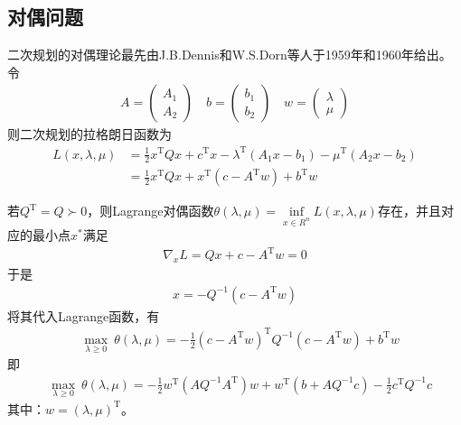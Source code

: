     \subsection{对偶问题}
        \par
        二次规划的对偶理论最先由J.B.Dennis和W.S.Dorn等人于1959年和1960年给出。令
        \begin{align*}
        A=\begin{pmatrix} A_1 \\ A_2\end{pmatrix}\quad b=\begin{pmatrix} b_1\\b_2 \end{pmatrix} \quad w=\begin{pmatrix}\lambda \\\mu \end{pmatrix}
        \end{align*}
        则二次规划的拉格朗日函数为
        \begin{align*}
         L(x,\lambda,\mu)&=\frac{1}{2}x^\mathrm{T} Qx+c^\mathrm{T} x-{\lambda}^\mathrm{T} (A_1x-b_1)-{\mu}^\mathrm{T} (A_2x-b_2)\\
         &=\frac{1}{2}x^\mathrm{T} Qx+x^\mathrm{T} (c-A^\mathrm{T} w)+b^\mathrm{T} w
        \end{align*}
        \par
        若$Q^\mathrm{T} =Q\succ 0$，则Lagrange对偶函数$\theta(\lambda,\mu)=\mathop {\inf}\limits_{x \in R^n}L(x,\lambda,\mu)$存在，并且对应的最小点$x^*$满足
        \begin{align*}
         {\nabla}_xL=Qx+c-A^\mathrm{T} w=0
        \end{align*}
        于是
        \begin{align*}
         x=-Q^{-1}(c-A^\mathrm{T} w)
        \end{align*}
        将其代入Lagrange函数，有
        \begin{align*}
        & \mathop{\max}\limits_{\lambda \geqslant 0}\  \theta(\lambda,\mu)=-\frac 12(c-A^\mathrm{T} w)^\mathrm{T} Q^{-1}(c-A^\mathrm{T} w)+b^\mathrm{T} w
        \end{align*}
        即
        \begin{align}
        \label{对偶问题的拉格朗日函数1}
        & \mathop{\max}\limits_{\lambda \geqslant 0}\  \theta(\lambda,\mu)=-\frac 12w^\mathrm{T} (AQ^{-1}A^\mathrm{T} )w+w^\mathrm{T} (b+AQ^{-1}c)-\frac 12 c^\mathrm{T} Q^{-1}c
        \end{align}
        其中：$w=(\lambda,\mu)^\mathrm{T} $。
